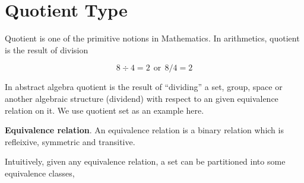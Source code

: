 \chapter{Quotient Type}
\label{qt}












Quotient is one of the primitive notions in Mathematics. 
In arithmetics, quotient is the result of division

$$8 \div 4 = 2 ~~ \text{or}~~ 8/4 = 2$$


In abstract algebra quotient is the result of ``dividing'' a set, group, space or another algebraic structure (dividend) with respect to an given equivalence relation on it. We use quotient set as an example here.

\begin{definition}
\textbf{Equivalence relation}.
An equivalence relation is a binary
relation which is refleixive, symmetric and transitive.
\end{definition}

Intuitively, given any equivalence relation, a set can be partitioned into
some equivalence classes,

